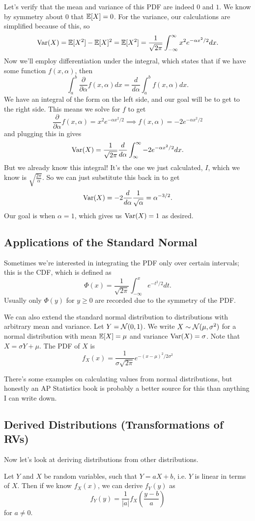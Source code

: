 \documentclass[11 pt]{scrartcl}
\begin{document}
    Let's verify that the mean and variance of this PDF are indeed $0$ and $1$. We know by symmetry about 0 that $\mathbb E[X] = 0$. For the variance, our calculations are simplified because of this, so 
    \[ \text{Var}(X) = \mathbb E[X^2] - \mathbb E[X]^2 = \mathbb E[X^2] = \dfrac{1}{\sqrt{2\pi}}\int_{-\infty}^{\infty} x^2 e^{-\alpha x^2/2} dx.\]
    Now we'll employ differentiation under the integral, which states that if we have some function $f(x,\alpha)$, then 
    \[ \int_a^b \dfrac{\partial}{\partial \alpha} f(x,\alpha) dx = \dfrac{d}{d\alpha}\int_a^b f(x,\alpha) dx.\] 
    We have an integral of the form on the left side, and our goal will be to get to the right side. This means we solve for $f$ to get
    \[ \dfrac{\partial}{\partial \alpha} f(x,\alpha) = x^2e^{-\alpha x^2/2} \implies f(x,\alpha) = -2e^{-\alpha x^2/2}\]
    and plugging this in gives 
    \[ \text{Var}(X) = \dfrac{1}{\sqrt{2\pi}} \dfrac{d}{d\alpha}\int_{\infty}^\infty -2e^{-\alpha x^2/2}dx.\] 
    But we already know this integral! It's the one we just calculated, $I$, which we know is $\sqrt{\frac{2\pi}{\alpha}}$. So we can just substitute this back in to get 
    \[ \text{Var}(X) = -2 \dfrac{d}{d\alpha} \dfrac{1}{\sqrt{\alpha}} = \alpha^{-3/2}. \]
    Our goal is when $\alpha = 1$, which gives us $\text{Var}(X) = 1$ as desired. 

\subsection{Applications of the Standard Normal}
    Sometimes we're interested in integrating the PDF only over certain intervals; this is the CDF, which is defined as 
    \[ \Phi(x) = \dfrac{1}{\sqrt{2\pi}} \int_{-\infty}^x e^{-t^2/2} dt.\] 
    Usually only $\Phi(y)$ for $y\geq 0$ are recorded due to the symmetry of the PDF. 

    We can also extend the standard normal distribution to distributions with arbitrary mean and variance. Let $Y = \mathcal{N}(0,1)$. We write $X \sim \mathcal{N}(\mu, \sigma^2)$ for a normal distribution with mean $\mathbb E[X] = \mu$ and variance $\text{Var}(X) = \sigma$. Note that $X = \sigma Y + \mu$. The PDF of $X$ is 
    \[ f_X(x) = \dfrac{1}{\sigma\sqrt{2\pi}}e^{-(x-\mu)^2/2\sigma^2}\]

    There's some examples on calculating values from normal distributions, but honestly an AP Statistics book is probably a better source for this than anything I can write down. 

    \subsection{Derived Distributions (Transformations of RVs)}
Now let's look at deriving distributions from other distributions. 
\begin{theorem}
    Let $Y$ and $X$ be random variables, such that $Y = aX + b$, i.e. $Y$ is linear in terms of $X$.  Then if we know $f_X(x)$, we can derive $f_Y(y)$ as 
    \[ f_Y(y) = \dfrac{1}{|a|} f_X\left(\dfrac{y-b}{a}\right)\] 
    for $a\not= 0$. 
\end{theorem}
\end{document}

